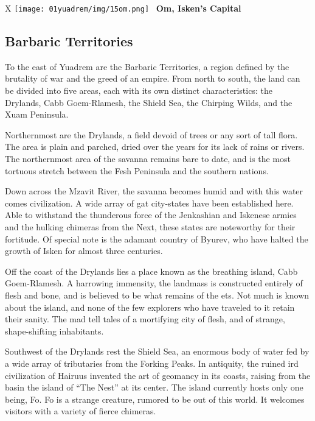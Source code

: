 
\begin{table*}[b]%
    \begin{DndTable}[width=\linewidth]{X}
        \centering
        \texttt{[image: 01yuadrem/img/15om.png]} \
        \centering \large{\textbf{Om, Isken's Capital}}
    \end{DndTable}
\end{table*}

\subsection*{Barbaric Territories} \label{ssec::barbaricterritories}

To the east of Yuadrem are the Barbaric Territories, a region defined by the brutality of war and the greed of an empire.
From north to south, the land can be divided into five areas, each with its own distinct characteristics: the Drylands, Cabb Goem-Rlamesh, the Shield Sea, the Chirping Wilds, and the Xuam Peninsula.

Northernmost are the Drylands, a field devoid of trees or any sort of tall flora.
The area is plain and parched, dried over the years for its lack of rains or rivers.
The northernmost area of the savanna remains bare to date, and is the most tortuous stretch between the Fesh Peninsula and the southern nations.

Down across the Mzavit River, the savanna becomes humid and with this water comes civilization.
A wide array of gat city-states have been established here.
Able to withstand the thunderous force of the Jenkashian and Iskenese armies and the hulking chimeras from the Next, these states are noteworthy for their fortitude.
Of special note is the adamant country of Byurev, who have halted the growth of Isken for almost three centuries.

Off the coast of the Drylands lies a place known as the breathing island, Cabb Goem-Rlamesh.
A harrowing immensity, the landmass is constructed entirely of flesh and bone, and is believed to be what remains of the ets.
Not much is known about the island, and none of the few explorers who have traveled to it retain their sanity.
The mad tell tales of a mortifying city of flesh, and of strange, shape-shifting inhabitants.

Southwest of the Drylands rest the Shield Sea, an enormous body of water fed by a wide array of tributaries from the Forking Peaks.
In antiquity, the ruined ird civilization of Hairuus invented the art of geomancy in its coasts, raising from the basin the island of ``The Nest'' at its center.
The island currently hosts only one being, Fo.
Fo is a strange creature, rumored to be out of this world.
It welcomes visitors with a variety of fierce chimeras.

